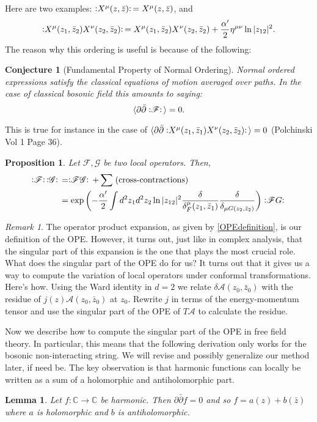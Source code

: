 \documentclass{report}
\theoremstyle{plain}
\newtheorem{lemma}[theorem]{Lemma}
\newtheorem{proposition}[theorem]{Proposition}
\newtheorem{conjecture}[theorem]{Conjecture}
\theoremstyle{definition}
\theoremstyle{remark}
\newtheorem*{remark}{Remark}
\newcommand{\FR}[2]{\frac{#1}{#2}}
\newcommand{\ms}{\mathscr}
\newcommand{\di}{\partial}
\newcommand{\NO}[1]{\vcentcolon\mathrel{#1}\vcentcolon\,}
\newcommand{\bC}{\mathbb{C}}
\begin{document}
Here are two examples: $\NO{X^\mu(z,\bar z)} = X^\mu(z,\bar z)$,
and
\begin{align}
\label{normalorder-example}
\NO{X^\mu(z_1,\bar z_2) X^\nu(z_2,\bar z_2)} = X^\mu(z_1,\bar
z_2) X^\nu(z_2,\bar z_2) + \FR{\alpha'}{2}\eta^{\mu\nu}\ln|z_{12}|^2.
\end{align}
The reason why this ordering is useful is because of the following:
\begin{conjecture}[Fundamental Property of Normal Ordering]
\label{fundamentalpropnormalorder}
Normal ordered expressions satisfy the classical
equations of motion averaged over paths. In the case of classical bosonic
field this amounts to saying:
\[ \braket{ \di\bar\di \NO{\ms F} } = 0.\]
\end{conjecture}
This is true for instance in the case of $\braket{\di\bar\di \NO{
X^\mu(z_1,\bar z_1) X^\nu(z_2,\bar z_2)}} = 0$ (Polchinski Vol 1 Page 36).
\begin{proposition}
\label{prop-product-normal-order}
Let $\ms F,\ms G$ be two local operators. Then,
\begin{align}
 \NO{\ms F}\NO{\ms G} &=
\NO{\ms F\ms G} + \sum \;(\text{cross-contractions})\\
&= \exp\left( -\FR{\alpha'}{2}\int d^2z_1 d^2z_2 \ln|z_{12}|^2
\FR{\delta}{\delta^\mu_F(z_1,\bar z_1)}
\FR{\delta}{\delta_{\mu G(z_2,\bar z_2)}}
\right) \NO{\ms FG}
\end{align}
\end{proposition}

\begin{remark} \label{necessityOPE} The operator product expansion, as
given by \eqref{OPEdefinition}, is our definition of the OPE. However,
it turns out, just like in complex analysis, that the singular part of
this expansion is the one that plays the most crucial role. What does
the singular part of the OPE do for us? It turns out that it gives us a
way to compute the variation of local operators under conformal
transformations. Here's how.  Using the Ward identity in $d=2$ we
relate $\delta\ms A(z_0,\bar z_0)$ with the residue of $j(z)\ms
A(z_0,\bar z_0)$ at $z_0$. Rewrite $j$ in terms of the energy-momentum
tensor and use the singular part of the OPE of $T\ms A$ to calculate
the residue.
\end{remark}

Now we describe how to compute the singular part of the OPE in free field
theory. In particular, this means that the following derivation only works
for the bosonic non-interacting string. We will revise and possibly
generalize our method later, if need be. The key observation is that
harmonic functions can locally be written as a sum of a holomorphic and
antiholomorphic part.
\begin{lemma} Let $f : \bC \to \bC$ be harmonic. Then $\di\bar\di f = 0$
and so $f = a(z) + b(\bar z)$ where $a$ is holomorphic and $b$ is
antiholomorphic.
\end{lemma}
\end{document}
